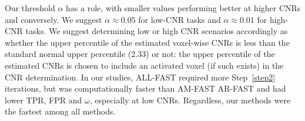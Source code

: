 Our threshold $\alpha$ has a role, with smaller values performing
better at higher CNRs and conversely. We suggest $\alpha\approx0.05$
for low-CNR tasks 
and $\alpha\approx0.01$ for high-CNR tasks. We suggest determining low or high CNR scenarios
accordingly as whether the upper percentile of the estimated
voxel-wise CNRs is less than the standard normal upper percentile
(2.33) or not: the upper percentile of the estimated CNRs 
is chosen to include an activated voxel (if such exists) in the
CNR determination. In our studies, ALL-FAST required more Step~\ref{step2}
iterations, but was computationally faster than AM-FAST AR-FAST and
had lower TPR, FPR and $\omega$, especially at low 
CNRs. Regardless, our methods were the fastest among all  
methods. %
\begin{comment}



For low CNRs, both CT and TP11 perform poorly, but 
AM-FAST and AR-FAST perform quite well. As with
Figure~\ref{fig:sim.activ}, both CT and TP11 improve with
increased CNR: indeed CT is marginally the best performer for when
CNR=2.0 and with no autocorrelation ($p=0$). Interestingly, for
CNR=2.0, CT does worse than AM-FAST or AR-FAST for the decreasing
AR coefficients case but not necessarily for the other
cases. AM-FAST and AR-FAST perform very similarly at all settings,
however AM-FAST is computationally faster than AR-FAST. 
The poorer performance of CT relative to the FAST algorithms
is not surprising because {\tt 3dClustSim} and other such functions
are not very adaptive in their execution. TP11 is however, somewhat
more adaptive, through the choice of the sequence of smoothing
parameters that is left to the user. Specifying this sequence
appropriately may, however, require considerable skill, and the
default values provided in the {\tt fmri} package do not appear to be
adequate enough for lower CNR situations. On the other hand, our approach
determines the optimal smoothing from the SPM at each iteration through likelihood maximization (AM-FAST) or robust methods (AR-FAST). Interestingly though, we have found that $\alpha$ plays a
role in the FAST algorithms with smaller values performing marginally
better with higher CNRs and higher values performing substantially better for lower CNRs.
As a via media, we use $\alpha=0.025$ in our application.
\end{comment}


